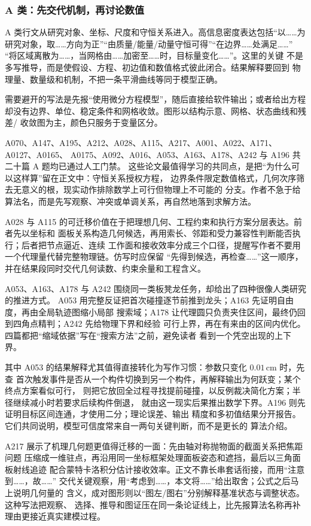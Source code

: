 \subsubsection{A 类：先交代机制，再讨论数值}

A 类行文从研究对象、坐标、尺度和守恒关系进入。高信息密度表达包括“以……为
研究对象，取……方向为正”“由质量/能量/动量守恒可得”“在边界……处满足……”
“将区域离散为……，当网格由……加密至……时，目标量变化……”。这里的关键
不是多写推导，而是使假设、方程、初边值和数值格式彼此闭合。结果解释要回到
物理量、数量级和机制，不把一条平滑曲线等同于模型正确。

需要避开的写法是先报“使用微分方程模型”，随后直接给软件输出；或者给出方程
却没有边界、单位、稳定条件和网格收敛。图形以结构示意、网格、状态曲线和残差/
收敛图为主，颜色只服务于变量区分。

A070、A147、A195、A212、A028、A115、A217、A001、A022、A171、A0127、A0165、
A0175、A092、A016、A053、A163、A178、A242 与 A196 共二十篇 A 题均已通过人工门禁。
这些论文最值得学习的共同点，是把“为什么可以这样算”留在正文中：守恒关系授权方程，
边界条件限定数值格式，几何次序筛去无意义的根，现实动作排除数学上可行但物理上不可能的
分支。作者不急于给算法名，而是先写观察、冲突或单调关系，再自然地落到求解方法。

A028 与 A115 的可迁移价值在于把理想几何、工程约束和执行方案分层表达。前者先以坐标和
面板关系构造几何候选，再用索长、邻距和受力兼容性判断能否执行；后者把节点逼近、连续
工作面和接收效率分成三个口径，提醒写作者不要用一个代理量代替完整物理链。仿写时应保留
“先得到候选，再检查……”这一顺序，并在结果段同时交代几何读数、约束余量和工程含义。

A053、A163、A178 与 A242 围绕同一类板凳龙任务，却给出了四种很像人类研究的推进方式。
A053 用完整反证把首次碰撞逐节前推到龙头；A163 先证明自由度，再由全局轨迹图缩小局部
搜索域；A178 让代理圆只负责夹住区间，最终仍回到四角点精判；A242 先给物理下界和经验
可行上界，再在有来由的区间内优化。四篇都把“缩域依据”写在“搜索方法”之前，避免读者
看到一个凭空出现的上下界。

其中 A053 的结果解释尤其值得直接转化为写作习惯：参数只变化 $0.01\,\mathrm{cm}$ 时，先查
首次触发事件是否从一个构件切换到另一个构件，再解释输出为何跃变；某个终点方案看似可行，
则把它放回全过程寻找提前碰撞，以反例裁决简化方案；半径继续减小时若要求后续构件倒退，
就由这一现实后果推出数学下界。A196 则先证明目标区间连通，才使用二分；理论误差、输出
精度和多初值结果分开报告。它们共同说明，模型可信度常来自一两句关键判断，而不是更长的
算法介绍。

A217 展示了机理几何题更值得迁移的一面：先由轴对称抛物面的截面关系把焦距问题
压缩成一维驻点，再沿用同一坐标框架处理面板姿态和遮挡，最后以三角面板射线追迹
配合蒙特卡洛积分估计接收效率。正文不靠长串套话衔接，而用“注意到……，故……”
交代关键观察，用“考虑到……，本文将……”给出取舍；公式之后马上说明几何量的
含义，成对图形则以“图左/图右”分别解释基准状态与调整状态。这种写法把观察、
选择、推导和图证压在同一条论证线上，比先报算法名称再补理由更接近真实建模过程。

